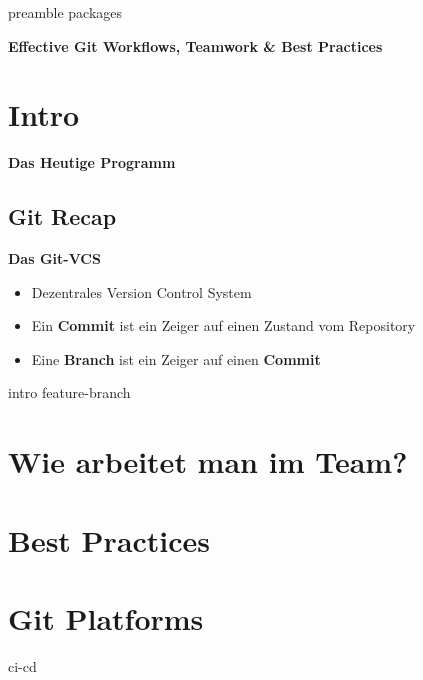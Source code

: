 \RequirePackage{import}
{preamble}
{packages}

    \begin{frame}[c]
        \centering
        \Large
        \textbf{Effective Git Workflows, Teamwork \& Best Practices}
    \end{frame}

    \section{Intro}\label{sec:intro}
    \begin{frame}[c]
        \slidehead
        \vspace{-1em}
        \large
        \textbf{Das Heutige Programm}
        \vspace{1em}
        \tableofcontents[subsubsectionstyle=hide]
    \end{frame}

    \subsection{Git Recap}\label{subsec:git-recap}
    \begin{frame}[c]
        \slidehead
        \vspace{-1em}
        \centering
        \large
        \textbf{Das Git-VCS}
        \vspace{2em}
        \begin{itemize}[<+->]
            \item Dezentrales Version Control System
            \item Ein \textbf{Commit} ist ein Zeiger auf einen Zustand vom Repository
            \item Eine \textbf{Branch} ist ein Zeiger auf einen \textbf{Commit}
        \end{itemize}
    \end{frame}

    {intro}
    {feature-branch}
    \section{Wie arbeitet man im Team?}\label{sec:team}
    \section{Best Practices}\label{sec:best-practices}
    \section{Git Platforms}\label{sec:git-platforms}

    {ci-cd}


